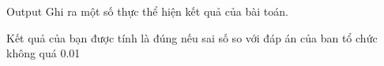 Output
Ghi ra một số thực thể hiện kết quả của bài toán.

Kết quả của bạn được tính là đúng nếu sai số so với đáp án của ban tổ chức không quá 0.01